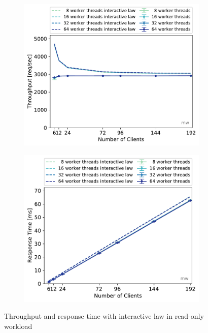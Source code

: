 \documentclass[11pt,a4paper]{article}
\begin{document}

\begin{figure}
	\begin{subfigure}[b]{.49\linewidth}
		\centering
		\includegraphics[width=\linewidth]{data/exp31_ro_tp_nc_w.pdf}
	\end{subfigure}\hfill
	\begin{subfigure}[b]{.49\linewidth}
		\centering
		\includegraphics[width=\linewidth]{data/exp31_ro_rt_nc_w.pdf}
	\end{subfigure}%
	\caption{Throughput and response time with interactive law in read-only workload}
\end{figure}
\end{document}
